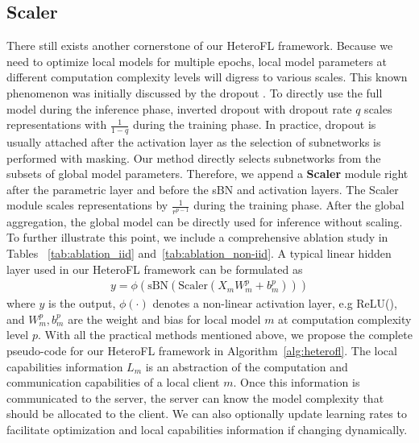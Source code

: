 \documentclass{article} %
\begin{document}
\subsection{Scaler}
There still exists another cornerstone of our HeteroFL framework. Because we need to optimize local models for multiple epochs, local model parameters at different computation complexity levels will digress to various scales. This known phenomenon was initially discussed by the dropout \citep{srivastava2014dropout}. To directly use the full model during the inference phase, inverted dropout with dropout rate $q$ scales representations with $\frac{1}{1-q}$ during the training phase. In practice, dropout is usually attached after the activation layer as the selection of subnetworks is performed with masking. Our method directly selects subnetworks from the subsets of global model parameters. Therefore, we append a \textbf{Scaler} module right after the parametric layer and before the sBN and activation layers. The Scaler module scales representations by $\frac{1}{r^{p-1}}$ during the training phase. After the global aggregation, the global model can be directly used for inference without scaling. To further illustrate this point, we include a comprehensive ablation study in Tables ~\ref{tab:ablation_iid} and~\ref{tab:ablation_non-iid}.
A typical linear hidden layer used in our HeteroFL framework can be formulated as
\begin{align}
    y = \phi(\text{sBN}(\text{Scaler}(X_mW_m^p + b_m^p)))
\end{align}
where $y$ is the output, $\phi(\cdot)$ denotes a non-linear activation layer, e.g ReLU(), and $W_m^p, b_m^p$ are the weight and bias for local model $m$ at computation complexity level $p$. With all the practical methods mentioned above, we propose the complete pseudo-code for our HeteroFL framework in Algorithm~\ref{alg:heterofl}. The local capabilities information $L_m$ is an abstraction of the computation and communication capabilities of a local client $m$. Once this information is communicated to the server, the server can know the model complexity that should be allocated to the client. We can also optionally update learning rates to facilitate optimization and local capabilities information if changing dynamically.
\end{document}
